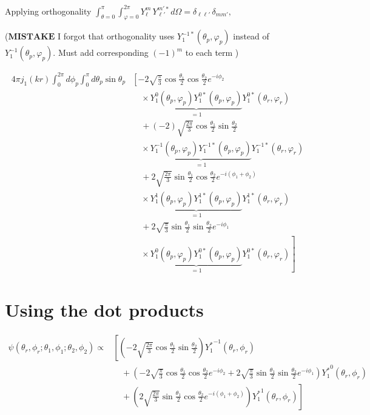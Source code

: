 \documentclass[12pt]{article}
\begin{document}
	 
	 Applying orthogonality ${\displaystyle \int _{\theta =0}^{\pi }\int _{\varphi =0}^{2\pi }Y_{\ell }^{m}\,Y_{\ell '}^{m'}{}^{*}\,d\Omega =\delta _{\ell \ell '}\,\delta _{mm'},}$
	 
	 ($\textbf{MISTAKE}$ I forgot that orthogonality uses $Y_{1}^{-1*}(\theta_p,\varphi_p)$ instead of $Y_{1}^{-1}(\theta_p,\varphi_p)$. Must add corresponding $(-1)^m$ to each term )
	 
     \[
    	 \begin{aligned}
    	 	4 \pi j_1 (kr) \int_0^{2 \pi} d \phi_p \int_{0}^{\pi} d \theta_p \sin \theta_p
    	 	&\left[ -2 \sqrt{\frac{\pi}{3}} \cos \frac{\theta_1}{2} \cos \frac{\theta_2}{2} e^{-i \phi_2} \right. \\
    	 	&\quad \times \underbrace{Y_{1}^{0}(\theta_p,\varphi_p) Y_{1}^{0*}(\theta_p,\varphi_p)}_{=1} Y_{1}^{0*}(\theta_r,\varphi_r) \\
    	 	&\quad +  (-2) \sqrt{\frac{2\pi}{3}} \cos \frac{\theta_1}{2} \sin \frac{\theta_2}{2}  \\
    	 	&\quad \times \underbrace{Y_{1}^{-1}(\theta_p,\varphi_p) Y_{1}^{-1*}(\theta_p,\varphi_p)}_{=1}  Y_{1}^{-1*}(\theta_r,\varphi_r)\\
    	 	&\quad + 2 \sqrt{\frac{2 \pi}{3}} \sin \frac{\theta_1}{2} \cos \frac{\theta_2}{2} e^{-i(\phi_1 + \phi_2)} \\
    	 	&\quad \times \underbrace{Y_{1}^{1}(\theta_p,\varphi_p) Y_{1}^{1*}(\theta_p,\varphi_p)}_{=1} Y_{1}^{1*}(\theta_r,\varphi_r) \\
    	 	&\quad + 2 \sqrt{\frac{\pi}{3}} \sin \frac{\theta_1}{2} \sin \frac{\theta_2}{2} e^{-i\phi_1} \\
    	 	&\left.\quad \times \underbrace{Y_{1}^{0}(\theta_p,\varphi_p) Y_{1}^{0*}(\theta_p,\varphi_p)}_{=1} Y_{1}^{0*}(\theta_r,\varphi_r) \right]
    	 \end{aligned}
    	 \]

    \section{Using the dot products}
    \[
    \begin{aligned}
    \psi\left(\theta_r, \phi_r; \theta_1, \phi_1; \theta_2, \phi_2\right) \propto &\left[\left(-2 \sqrt{\frac{2\pi}{3}} \cos \frac{\theta_1}{2} \sin \frac{\theta_2}{2} \right) {Y^*_{1}}^{-1}(\theta_r, \phi_r) \right. \\
    &\quad + \left(-2 \sqrt{\frac{\pi}{3}} \cos \frac{\theta_1}{2} \cos \frac{\theta_2}{2} e^{-i \phi_2} + 2 \sqrt{\frac{\pi}{3}} \sin \frac{\theta_1}{2} \sin \frac{\theta_2}{2} e^{-i\phi_1}\right) {Y^*_{1}}^{0}(\theta_r, \phi_r) \\
    &\quad + \left.\left(2 \sqrt{\frac{2 \pi}{3}} \sin \frac{\theta_1}{2} \cos \frac{\theta_2}{2} e^{-i (\phi_1 + \phi_2)} \right){Y^*_{1}}^{1}(\theta_r, \phi_r)  \right]
    \end{aligned}
    \]
\end{document}

